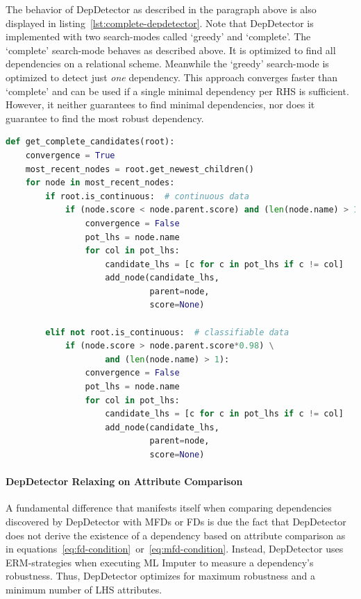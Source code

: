 The behavior of DepDetector as described in the paragraph above is also displayed in listing~\ref{lst:complete-depdetector}.
Note that DepDetector is implemented with two search-modes called `greedy' and `complete'.
The `complete' search-mode behaves as described above.
It is optimized to find all dependencies on a relational scheme.
Meanwhile the `greedy' search-mode is optimized to detect just \emph{one} dependency.
This approach converges faster than `complete' and can be used if a single minimal dependency per RHS is sufficient.
However, it neither guarantees to find minimal dependencies, nor does it guarantee to find the most robust dependency.

\begin{lstlisting}[caption={`Complete' candidate generation in the DepDetector algorithm},captionpos=b,language=Python,label=lst:complete-depdetector]
def get_complete_candidates(root):
    convergence = True
    most_recent_nodes = root.get_newest_children()
    for node in most_recent_nodes:
        if root.is_continuous:  # continuous data
            if (node.score < node.parent.score) and (len(node.name) > 1):
                convergence = False
                pot_lhs = node.name
                for col in pot_lhs:
                    candidate_lhs = [c for c in pot_lhs if c != col]
                    add_node(candidate_lhs,
                             parent=node,
                             score=None)

        elif not root.is_continuous:  # classifiable data
            if (node.score > node.parent.score*0.98) \
                    and (len(node.name) > 1):
                convergence = False
                pot_lhs = node.name
                for col in pot_lhs:
                    candidate_lhs = [c for c in pot_lhs if c != col]
                    add_node(candidate_lhs,
                             parent=node,
                             score=None)
\end{lstlisting}

\paragraph{DepDetector Relaxing on Attribute Comparison}
A fundamental difference that manifests itself when comparing dependencies discovered by DepDetector with MFDs or FDs is due the fact that DepDetector does not derive the existence of a dependency based on attribute comparison as in equations~\ref{eq:fd-condition}~or~\ref{eq:mfd-condition}.
Instead, DepDetector uses ERM-strategies when executing ML Imputer to measure a dependency's robustness.
Thus, DepDetector optimizes for maximum robustness and a minimum number of LHS attributes.
